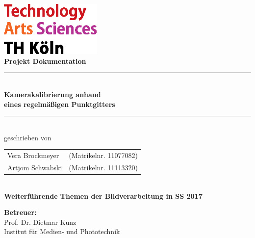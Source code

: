 \thispagestyle{empty}
\begin{center}
	\includegraphics[width=5cm]{Images/logo_TH}\\[12ex]
	{\Huge\textbf{Projekt Dokumentation}}\\[8ex]
	\rule{.8\textwidth}{.2pt}
	{\Large\\[1ex] \textbf{Kamerakalibrierung anhand \\ eines regelmäßigen Punktgitters }}\\
	\rule{.8\textwidth}{.2pt}\\[10ex]
	geschrieben von\\[2ex]
	\begin{tabular}{ll}
		Vera Brockmeyer &(Matrikelnr. 11077082)\\
		Artjom Schwabski &(Matrikelnr. 11113320)\\
	\end{tabular}\\[10ex]
	\textbf{Weiterführende Themen der Bildverarbeitung in SS 2017}\\			
\end{center}
\vfill
\begin{flushleft}
	{\bf Betreuer:}\\
	Prof. Dr. Dietmar Kunz\\
	Institut für Medien- und Phototechnik
\end{flushleft}
\newpage